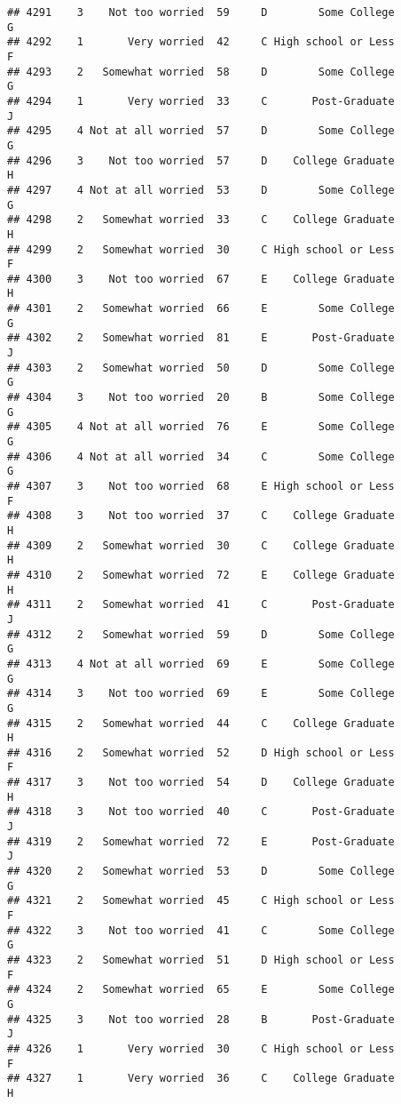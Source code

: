 \documentclass[
]{article}
\begin{document}
\begin{verbatim}
## 4291    3    Not too worried  59     D        Some College         G
## 4292    1       Very worried  42     C High school or Less         F
## 4293    2   Somewhat worried  58     D        Some College         G
## 4294    1       Very worried  33     C       Post-Graduate         J
## 4295    4 Not at all worried  57     D        Some College         G
## 4296    3    Not too worried  57     D    College Graduate         H
## 4297    4 Not at all worried  53     D        Some College         G
## 4298    2   Somewhat worried  33     C    College Graduate         H
## 4299    2   Somewhat worried  30     C High school or Less         F
## 4300    3    Not too worried  67     E    College Graduate         H
## 4301    2   Somewhat worried  66     E        Some College         G
## 4302    2   Somewhat worried  81     E       Post-Graduate         J
## 4303    2   Somewhat worried  50     D        Some College         G
## 4304    3    Not too worried  20     B        Some College         G
## 4305    4 Not at all worried  76     E        Some College         G
## 4306    4 Not at all worried  34     C        Some College         G
## 4307    3    Not too worried  68     E High school or Less         F
## 4308    3    Not too worried  37     C    College Graduate         H
## 4309    2   Somewhat worried  30     C    College Graduate         H
## 4310    2   Somewhat worried  72     E    College Graduate         H
## 4311    2   Somewhat worried  41     C       Post-Graduate         J
## 4312    2   Somewhat worried  59     D        Some College         G
## 4313    4 Not at all worried  69     E        Some College         G
## 4314    3    Not too worried  69     E        Some College         G
## 4315    2   Somewhat worried  44     C    College Graduate         H
## 4316    2   Somewhat worried  52     D High school or Less         F
## 4317    3    Not too worried  54     D    College Graduate         H
## 4318    3    Not too worried  40     C       Post-Graduate         J
## 4319    2   Somewhat worried  72     E       Post-Graduate         J
## 4320    2   Somewhat worried  53     D        Some College         G
## 4321    2   Somewhat worried  45     C High school or Less         F
## 4322    3    Not too worried  41     C        Some College         G
## 4323    2   Somewhat worried  51     D High school or Less         F
## 4324    2   Somewhat worried  65     E        Some College         G
## 4325    3    Not too worried  28     B       Post-Graduate         J
## 4326    1       Very worried  30     C High school or Less         F
## 4327    1       Very worried  36     C    College Graduate         H

\end{verbatim}
\end{document}

